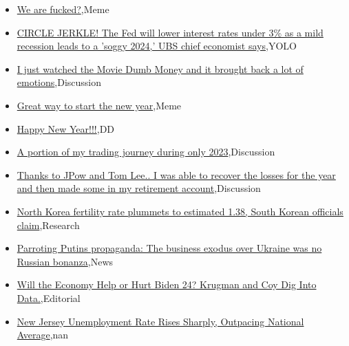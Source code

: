 \documentclass{article}%
\begin{document}
%
\begin{itemize}%
\item%
\href{https://reddit.com/r/wallstreetbets/comments/18vu8gl/we\_are\_fucked/}{We are fucked?},Meme%
\item%
\href{https://reddit.com/r/wallstreetbets/comments/18vt89t/circle\_jerkle\_the\_fed\_will\_lower\_interest\_rates/}{CIRCLE JERKLE! The Fed will lower interest rates under 3\% as a mild recession leads to a 'soggy 2024,' UBS chief economist says},YOLO%
\item%
\href{https://reddit.com/r/wallstreetbets/comments/18vs8as/i\_just\_watched\_the\_movie\_dumb\_money\_and\_it/}{I just watched the Movie Dumb Money and it brought back a lot of emotions},Discussion%
\item%
\href{https://reddit.com/r/wallstreetbets/comments/18vnnep/great\_way\_to\_start\_the\_new\_year/}{Great way to start the new year},Meme%
\item%
\href{https://reddit.com/r/Baystreetbets/comments/18vffzt/happy\_new\_year/}{Happy New Year!!!},DD%
\item%
\href{https://reddit.com/r/StockMarket/comments/18v3b06/a\_portion\_of\_my\_trading\_journey\_during\_only\_2023/}{A portion of my trading journey during only 2023},Discussion%
\item%
\href{https://reddit.com/r/StockMarket/comments/18v09uk/thanks\_to\_jpow\_and\_tom\_lee\_i\_was\_able\_to\_recover/}{Thanks to JPow and Tom Lee.. I was able to recover the losses for the year and then made some in my retirement account},Discussion%
\item%
\href{https://reddit.com/r/Economics/comments/18vt03k/north\_korea\_fertility\_rate\_plummets\_to\_estimated/}{North Korea fertility rate plummets to estimated 1.38, South Korean officials claim},Research%
\item%
\href{https://reddit.com/r/Economics/comments/18vel4z/parroting\_putins\_propaganda\_the\_business\_exodus/}{Parroting Putins propaganda: The business exodus over Ukraine was no Russian bonanza},News%
\item%
\href{https://reddit.com/r/Economics/comments/18vbv6a/will\_the\_economy\_help\_or\_hurt\_biden\_24\_krugman/}{Will the Economy Help or Hurt Biden 24? Krugman and Coy Dig Into Data.},Editorial%
\item%
\href{https://reddit.com/r/Economics/comments/18v996j/new\_jersey\_unemployment\_rate\_rises\_sharply/}{New Jersey Unemployment Rate Rises Sharply, Outpacing National Average},nan%
\end{itemize}%
\end{document}

